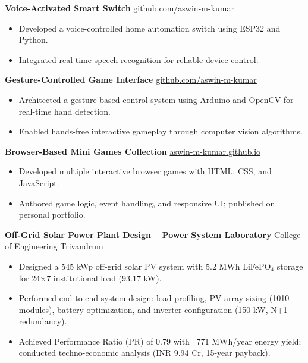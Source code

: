 \documentclass[a4paper,11pt]{article}
\begin{document}
\vspace{4pt}
\noindent
\textbf{Voice-Activated Smart Switch} \hfill \href{https://github.com/aswin-m-kumar}{github.com/aswin-m-kumar}
\begin{itemize}
  \item Developed a voice-controlled home automation switch using ESP32 and Python.
  \item Integrated real-time speech recognition for reliable device control.
\end{itemize}

\vspace{4pt}
\noindent
\textbf{Gesture-Controlled Game Interface} \hfill \href{https://github.com/aswin-m-kumar}{github.com/aswin-m-kumar}
\begin{itemize}
  \item Architected a gesture-based control system using Arduino and OpenCV for real-time hand detection.
  \item Enabled hands-free interactive gameplay through computer vision algorithms.
\end{itemize}

\vspace{4pt}
\noindent
\textbf{Browser-Based Mini Games Collection} \hfill \href{https://aswin-m-kumar.github.io}{aswin-m-kumar.github.io}
\begin{itemize}
  \item Developed multiple interactive browser games with HTML, CSS, and JavaScript.
  \item Authored game logic, event handling, and responsive UI; published on personal portfolio.
\end{itemize}

\vspace{4pt}
\noindent
\textbf{Off-Grid Solar Power Plant Design -- Power System Laboratory} \hfill College of Engineering Trivandrum
\begin{itemize}
  \item Designed a 545 kWp off-grid solar PV system with 5.2 MWh LiFePO$_4$ storage for 24$\times$7 institutional load (93.17 kW).
  \item Performed end-to-end system design: load profiling, PV array sizing (1010 modules), battery optimization, and inverter configuration (150 kW, N+1 redundancy).
  \item Achieved Performance Ratio (PR) of 0.79 with ~771 MWh/year energy yield; conducted techno-economic analysis (INR 9.94 Cr, 15-year payback).
\end{itemize}
\end{document}
